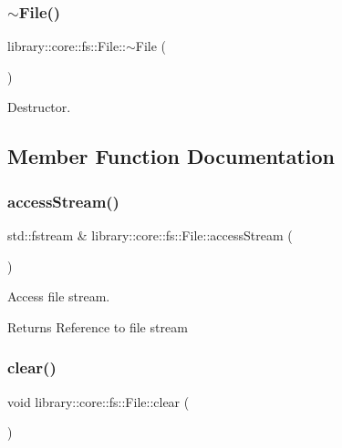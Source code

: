 \subsubsection{\texorpdfstring{$\sim$File()}{~File()}}
{\footnotesize\ttfamily library\+::core\+::fs\+::\+File\+::$\sim$\+File (\begin{DoxyParamCaption}{ }\end{DoxyParamCaption})}



Destructor. 



\subsection{Member Function Documentation}
\mbox{\label{classlibrary_1_1core_1_1fs_1_1_file_a2d6b8d823c82ebc60fefc459e2b7aa33}} 
\subsubsection{\texorpdfstring{accessStream()}{accessStream()}}
{\footnotesize\ttfamily std\+::fstream \& library\+::core\+::fs\+::\+File\+::access\+Stream (\begin{DoxyParamCaption}{ }\end{DoxyParamCaption})}



Access file stream. 

\begin{DoxyReturn}{Returns}
Reference to file stream 
\end{DoxyReturn}
\mbox{\label{classlibrary_1_1core_1_1fs_1_1_file_a0b95ab08dd8df2cc28b2e42a72ae0b9a}} 
\subsubsection{\texorpdfstring{clear()}{clear()}}
{\footnotesize\ttfamily void library\+::core\+::fs\+::\+File\+::clear (\begin{DoxyParamCaption}{ }\end{DoxyParamCaption})}



